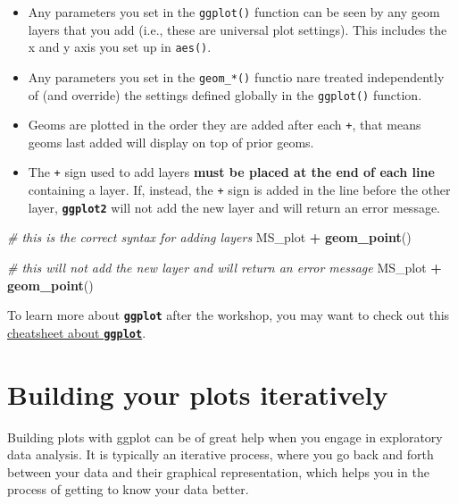 \documentclass[]{book}
\newenvironment{Shaded}{\begin{snugshade}}{\end{snugshade}}
\newcommand{\KeywordTok}[1]{\textcolor[rgb]{0.13,0.29,0.53}{\textbf{#1}}}
\newcommand{\StringTok}[1]{\textcolor[rgb]{0.31,0.60,0.02}{#1}}
\newcommand{\CommentTok}[1]{\textcolor[rgb]{0.56,0.35,0.01}{\textit{#1}}}
\newcommand{\OperatorTok}[1]{\textcolor[rgb]{0.81,0.36,0.00}{\textbf{#1}}}
\newcommand{\NormalTok}[1]{#1}
\providecommand{\tightlist}{%
  \setlength{\itemsep}{0pt}\setlength{\parskip}{0pt}}
\theoremstyle{definition}
\theoremstyle{definition}
\theoremstyle{definition}
\theoremstyle{remark}
\begin{document}
\begin{itemize}
\tightlist
\item
  Any parameters you set in the \texttt{ggplot()} function can be seen
  by any geom layers that you add (i.e., these are universal plot
  settings). This includes the x and y axis you set up in
  \texttt{aes()}.
\item
  Any parameters you set in the \texttt{geom\_*()} functio nare treated
  independently of (and override) the settings defined globally in the
  \texttt{ggplot()} function.
\item
  Geoms are plotted in the order they are added after each \texttt{+},
  that means geoms last added will display on top of prior geoms.
\item
  The \texttt{+} sign used to add layers \textbf{must be placed at the
  end of each line} containing a layer. If, instead, the \texttt{+} sign
  is added in the line before the other layer, \textbf{\texttt{ggplot2}}
  will not add the new layer and will return an error message.
\end{itemize}

\begin{Shaded}
\begin{Highlighting}[]
\CommentTok{# this is the correct syntax for adding layers}
\NormalTok{MS_plot }\OperatorTok{+}
\StringTok{  }\KeywordTok{geom_point}\NormalTok{()}

\CommentTok{# this will not add the new layer and will return an error message}
\NormalTok{MS_plot}
  \OperatorTok{+}\StringTok{ }\KeywordTok{geom_point}\NormalTok{()}
\end{Highlighting}
\end{Shaded}

To learn more about \textbf{\texttt{ggplot}} after the workshop, you may
want to check out this
\href{https://www.rstudio.com/wp-content/uploads/2016/11/ggplot2-cheatsheet-2.1.pdf}{cheatsheet
about \textbf{\texttt{ggplot}}}.

\section{Building your plots
iteratively}\label{building-your-plots-iteratively}

Building plots with ggplot can be of great help when you engage in
exploratory data analysis. It is typically an iterative process, where
you go back and forth between your data and their graphical
representation, which helps you in the process of getting to know your
data better.
\end{document}
